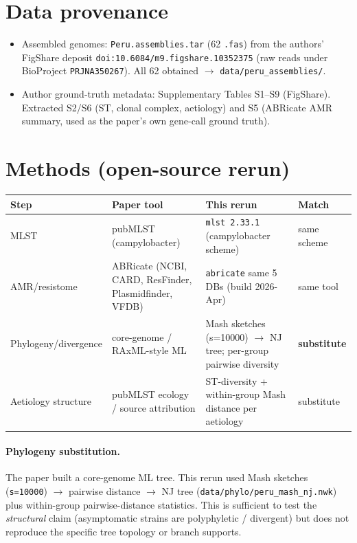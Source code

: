 \documentclass[11pt]{article}
\begin{document}
\section{Data provenance}

\begin{itemize}[leftmargin=1.5em]
  \item Assembled genomes: \texttt{Peru.assemblies.tar} (62 \texttt{.fas})
        from the authors' FigShare deposit
        \texttt{doi:10.6084/m9.figshare.10352375} (raw reads under BioProject
        \texttt{PRJNA350267}). All 62 obtained
        $\to$ \texttt{data/peru\_assemblies/}.
  \item Author ground-truth metadata: Supplementary Tables S1--S9 (FigShare).
        Extracted S2/S6 (ST, clonal complex, aetiology) and S5 (ABRicate AMR
        summary, used as the paper's own gene-call ground truth).
\end{itemize}

\section{Methods (open-source rerun)}

\begin{longtable}{@{}p{}p{}p{}p{}@{}}
\toprule
\textbf{Step} & \textbf{Paper tool} & \textbf{This rerun} & \textbf{Match} \\
\midrule
MLST & pubMLST (campylobacter) & \texttt{mlst 2.33.1} (campylobacter scheme) & same scheme \\
AMR/resistome & ABRicate (NCBI, CARD, ResFinder, Plasmidfinder, VFDB) &
  \texttt{abricate} same 5 DBs (build 2026-Apr) & same tool \\
Phylogeny/divergence & core-genome / RAxML-style ML &
  Mash sketches (s=10000) $\to$ NJ tree; per-group pairwise diversity &
  \textbf{substitute} \\
Aetiology structure & pubMLST ecology / source attribution &
  ST-diversity + within-group Mash distance per aetiology & substitute \\
\bottomrule
\end{longtable}

\paragraph{Phylogeny substitution.} The paper built a core-genome ML tree.
This rerun used Mash sketches (\texttt{s=10000}) $\to$ pairwise distance
$\to$ NJ tree (\texttt{data/phylo/peru\_mash\_nj.nwk}) plus within-group
pairwise-distance statistics. This is sufficient to test the \emph{structural}
claim (asymptomatic strains are polyphyletic / divergent) but does not
reproduce the specific tree topology or branch supports.
\end{document}
